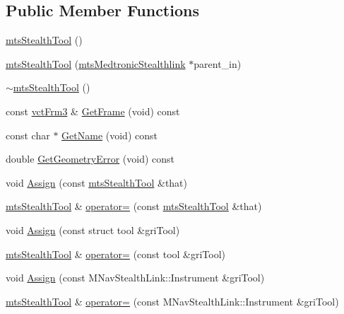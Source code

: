 \subsection*{Public Member Functions}
\begin{DoxyCompactItemize}
\item 
\hyperlink{classmts_stealth_tool_aa883de2b768f98fec69a6bc857b78323}{mts\+Stealth\+Tool} ()
\item 
\hyperlink{classmts_stealth_tool_a3b0f473d1b7b02f7861578a771bc8fc8}{mts\+Stealth\+Tool} (\hyperlink{classmts_medtronic_stealthlink}{mts\+Medtronic\+Stealthlink} $\ast$parent\+\_\+in)
\item 
\hyperlink{classmts_stealth_tool_a86b22b54518d7c3535e85e17f71d9cad}{$\sim$mts\+Stealth\+Tool} ()
\item 
const \hyperlink{vct_transformation_types_8h_a81feda0a02c2d1bc26e5553f409fed20}{vct\+Frm3} \& \hyperlink{classmts_stealth_tool_a45f638dd4baf99c685c050a87323fd82}{Get\+Frame} (void) const 
\item 
const char $\ast$ \hyperlink{classmts_stealth_tool_a99340f0661adaa23eabaf43394360164}{Get\+Name} (void) const 
\item 
double \hyperlink{classmts_stealth_tool_a83bb8e4413f625850653416e374b6fee}{Get\+Geometry\+Error} (void) const 
\item 
void \hyperlink{classmts_stealth_tool_a16fe29f2e0b33e1f2249a32c3adcae4a}{Assign} (const \hyperlink{classmts_stealth_tool}{mts\+Stealth\+Tool} \&that)
\item 
\hyperlink{classmts_stealth_tool}{mts\+Stealth\+Tool} \& \hyperlink{classmts_stealth_tool_a8e34fac36f9e6eb356116e06d9ab61c2}{operator=} (const \hyperlink{classmts_stealth_tool}{mts\+Stealth\+Tool} \&that)
\item 
void \hyperlink{classmts_stealth_tool_aefb688f5db9e6cb54d8af92196928b81}{Assign} (const struct tool \&gri\+Tool)
\item 
\hyperlink{classmts_stealth_tool}{mts\+Stealth\+Tool} \& \hyperlink{classmts_stealth_tool_aa727d88e875cc02aeeebfb7fcc47afdd}{operator=} (const tool \&gri\+Tool)
\item 
void \hyperlink{classmts_stealth_tool_aca8cf9986410e2b155c77b4a58faee83}{Assign} (const M\+Nav\+Stealth\+Link\+::\+Instrument \&gri\+Tool)
\item 
\hyperlink{classmts_stealth_tool}{mts\+Stealth\+Tool} \& \hyperlink{classmts_stealth_tool_a8a9407407b9126f0195af0a4abe945c5}{operator=} (const M\+Nav\+Stealth\+Link\+::\+Instrument \&gri\+Tool)
\item 

\end{DoxyCompactItemize}
